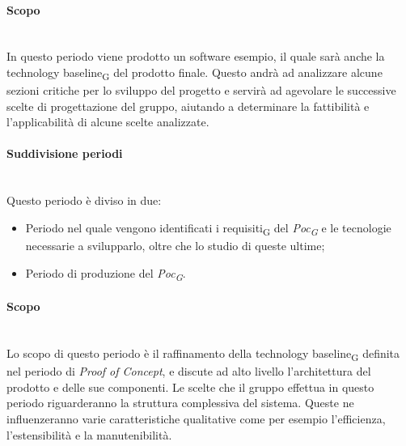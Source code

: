 	\paragraph {Scopo}\mbox{}\\
	In questo periodo viene prodotto un software esempio, il quale sarà anche la technology baseline\textsubscript{G} del prodotto finale. Questo andrà ad analizzare alcune sezioni critiche per lo sviluppo del progetto e servirà ad agevolare le successive scelte di progettazione del gruppo, aiutando a determinare la fattibilità e l'applicabilità di alcune scelte analizzate.
	\paragraph {Suddivisione periodi}\mbox{}\\
	Questo periodo è diviso in due:
	\begin{itemize}
		\item Periodo nel quale vengono identificati i requisiti\textsubscript{G} del \textit{Poc\textsubscript{G}} e le tecnologie necessarie a svilupparlo, oltre che lo studio di queste ultime;
		\item Periodo di produzione del \textit{Poc\textsubscript{G}}.
	\end{itemize}
	\paragraph {Scopo}\mbox{}\\
	Lo scopo di questo periodo è il raffinamento della technology baseline\textsubscript{G} definita nel periodo di \textit{Proof of Concept}, e discute ad alto livello l'architettura del prodotto e delle sue componenti. Le scelte che il gruppo effettua in questo periodo riguarderanno la struttura complessiva del sistema. Queste ne influenzeranno varie caratteristiche qualitative come per esempio l'efficienza, l'estensibilità e la manutenibilità.
